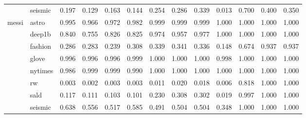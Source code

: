 \begin{tabular}{llrrrrrrrrrrr}
 & seismic & 0.197 & 0.129 & 0.163 & 0.144 & 0.254 & 0.286 & 0.339 & 0.013 & 0.700 & 0.400 & 0.350 \\
\cline{1-13}
\multirow[t]{8}{*}{messi} & astro & 0.995 & 0.966 & 0.972 & 0.982 & 0.999 & 0.999 & 0.999 & 1.000 & 1.000 & 1.000 & 1.000 \\
 & deep1b & 0.840 & 0.755 & 0.826 & 0.825 & 0.974 & 0.957 & 0.977 & 1.000 & 1.000 & 1.000 & 1.000 \\
 & fashion & 0.286 & 0.283 & 0.239 & 0.308 & 0.339 & 0.341 & 0.336 & 0.148 & 0.674 & 0.937 & 0.937 \\
 & glove & 0.996 & 0.996 & 0.996 & 0.999 & 1.000 & 1.000 & 1.000 & 0.998 & 1.000 & 1.000 & 1.000 \\
 & nytimes & 0.986 & 0.999 & 0.999 & 0.990 & 1.000 & 1.000 & 1.000 & 1.000 & 1.000 & 1.000 & 1.000 \\
 & rw & 0.003 & 0.002 & 0.003 & 0.003 & 0.011 & 0.020 & 0.018 & 0.006 & 0.818 & 1.000 & 1.000 \\
 & sald & 0.117 & 0.111 & 0.103 & 0.101 & 0.230 & 0.308 & 0.302 & 0.019 & 0.997 & 1.000 & 1.000 \\
 & seismic & 0.638 & 0.556 & 0.517 & 0.585 & 0.491 & 0.504 & 0.504 & 0.348 & 1.000 & 1.000 & 1.000 \\
\cline{1-13}
\bottomrule
\end{tabular}
